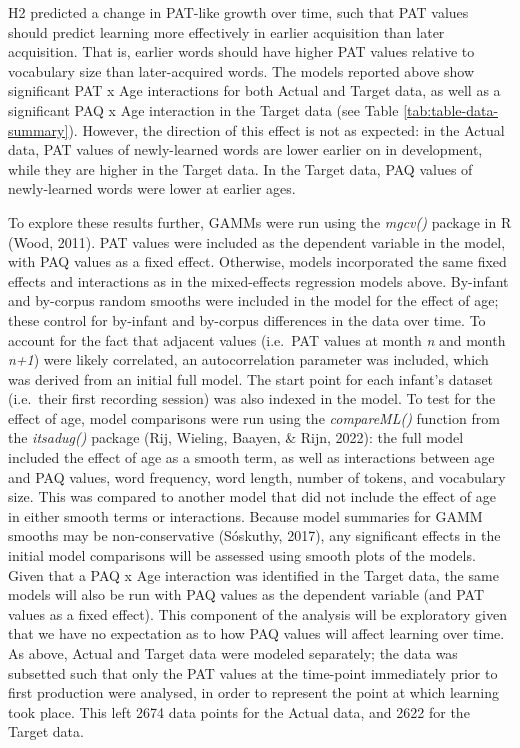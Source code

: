 \documentclass[
  man,mask,floatsintext]{apa6}
\begin{document}
H2 predicted a change in PAT-like growth over time, such that PAT values should predict learning more effectively in earlier acquisition than later acquisition. That is, earlier words should have higher PAT values relative to vocabulary size than later-acquired words. The models reported above show significant PAT x Age interactions for both Actual and Target data, as well as a significant PAQ x Age interaction in the Target data (see Table \ref{tab:table-data-summary}). However, the direction of this effect is not as expected: in the Actual data, PAT values of newly-learned words are lower earlier on in development, while they are higher in the Target data. In the Target data, PAQ values of newly-learned words were lower at earlier ages.

To explore these results further, GAMMs were run using the \emph{mgcv()} package in R (Wood, 2011). PAT values were included as the dependent variable in the model, with PAQ values as a fixed effect. Otherwise, models incorporated the same fixed effects and interactions as in the mixed-effects regression models above. By-infant and by-corpus random smooths were included in the model for the effect of age; these control for by-infant and by-corpus differences in the data over time. To account for the fact that adjacent values (i.e.~PAT values at month \emph{n} and month \emph{n+1}) were likely correlated, an autocorrelation parameter was included, which was derived from an initial full model. The start point for each infant's dataset (i.e.~their first recording session) was also indexed in the model. To test for the effect of age, model comparisons were run using the \emph{compareML()} function from the \emph{itsadug()} package (Rij, Wieling, Baayen, \& Rijn, 2022): the full model included the effect of age as a smooth term, as well as interactions between age and PAQ values, word frequency, word length, number of tokens, and vocabulary size. This was compared to another model that did not include the effect of age in either smooth terms or interactions. Because model summaries for GAMM smooths may be non-conservative (Sóskuthy, 2017), any significant effects in the initial model comparisons will be assessed using smooth plots of the models. Given that a PAQ x Age interaction was identified in the Target data, the same models will also be run with PAQ values as the dependent variable (and PAT values as a fixed effect). This component of the analysis will be exploratory given that we have no expectation as to how PAQ values will affect learning over time. As above, Actual and Target data were modeled separately; the data was subsetted such that only the PAT values at the time-point immediately prior to first production were analysed, in order to represent the point at which learning took place. This left 2674 data points for the Actual data, and 2622 for the Target data.
\end{document}
